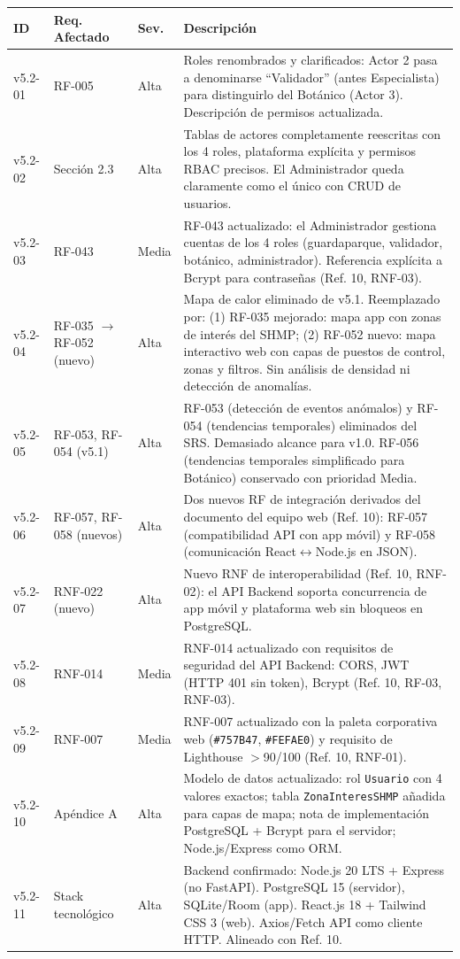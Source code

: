 \documentclass[12pt, a4paper]{article}
\begin{document}
\begin{longtable}{|p{1.5cm}|p{2.8cm}|p{2cm}|p{7.5cm}|}
\hline
\textbf{ID} & \textbf{Req. Afectado} & \textbf{Sev.} & \textbf{Descripci\'on} \\
\hline
\endhead
v5.2-01 & RF-005 & Alta & Roles renombrados y clarificados: Actor 2 pasa a denominarse ``Validador'' (antes Especialista) para distinguirlo del Bot\'anico (Actor 3). Descripci\'on de permisos actualizada. \\
\hline
v5.2-02 & Secci\'on 2.3 & Alta & Tablas de actores completamente reescritas con los 4 roles, plataforma expl\'icita y permisos RBAC precisos. El Administrador queda claramente como el \'unico con CRUD de usuarios. \\
\hline
v5.2-03 & RF-043 & Media & RF-043 actualizado: el Administrador gestiona cuentas de los 4 roles (guardaparque, validador, bot\'anico, administrador). Referencia expl\'icita a Bcrypt para contrase\~nas (Ref. 10, RNF-03). \\
\hline
v5.2-04 & RF-035 $\rightarrow$ RF-052 (nuevo) & Alta & Mapa de calor eliminado de v5.1. Reemplazado por: (1) RF-035 mejorado: mapa app con zonas de inter\'es del SHMP; (2) RF-052 nuevo: mapa interactivo web con capas de puestos de control, zonas y filtros. Sin an\'alisis de densidad ni detecci\'on de anomal\'ias. \\
\hline
v5.2-05 & RF-053, RF-054 (v5.1) & Alta & RF-053 (detecci\'on de eventos an\'omalos) y RF-054 (tendencias temporales) eliminados del SRS. Demasiado alcance para v1.0. RF-056 (tendencias temporales simplificado para Bot\'anico) conservado con prioridad Media. \\
\hline
v5.2-06 & RF-057, RF-058 (nuevos) & Alta & Dos nuevos RF de integraci\'on derivados del documento del equipo web (Ref. 10): RF-057 (compatibilidad API con app m\'ovil) y RF-058 (comunicaci\'on React$\leftrightarrow$Node.js en JSON). \\
\hline
v5.2-07 & RNF-022 (nuevo) & Alta & Nuevo RNF de interoperabilidad (Ref. 10, RNF-02): el API Backend soporta concurrencia de app m\'ovil y plataforma web sin bloqueos en PostgreSQL. \\
\hline
v5.2-08 & RNF-014 & Media & RNF-014 actualizado con requisitos de seguridad del API Backend: CORS, JWT (HTTP 401 sin token), Bcrypt (Ref. 10, RF-03, RNF-03). \\
\hline
v5.2-09 & RNF-007 & Media & RNF-007 actualizado con la paleta corporativa web (\texttt{\#757B47}, \texttt{\#FEFAE0}) y requisito de Lighthouse $>$90/100 (Ref. 10, RNF-01). \\
\hline
v5.2-10 & Ap\'endice A & Alta & Modelo de datos actualizado: rol \texttt{Usuario} con 4 valores exactos; tabla \texttt{ZonaInteresSHMP} a\~nadida para capas de mapa; nota de implementaci\'on PostgreSQL + Bcrypt para el servidor; Node.js/Express como ORM. \\
\hline
v5.2-11 & Stack tecnol\'ogico & Alta & Backend confirmado: Node.js 20 LTS + Express (no FastAPI). PostgreSQL 15 (servidor), SQLite/Room (app). React.js 18 + Tailwind CSS 3 (web). Axios/Fetch API como cliente HTTP. Alineado con Ref. 10. \\
\hline
\end{longtable}
\end{document}
